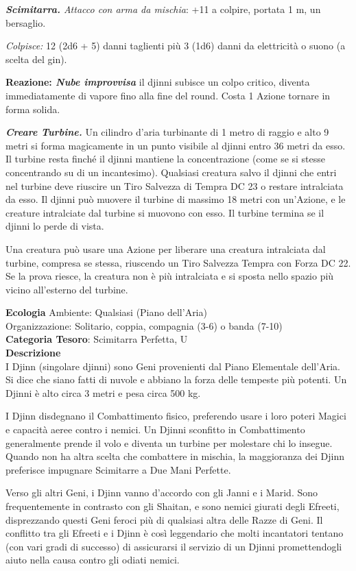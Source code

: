\begin{multicols}{2}
{\emph{\textbf{Scimitarra.} Attacco con arma da mischia}: +11 a colpire, portata 1 m, un bersaglio.

\emph{Colpisce:} 12 (2d6 + 5) danni taglienti più 3 (1d6) danni da elettricità o suono (a scelta del gin).

\textbf{Reazione: \emph{Nube improvvisa}} il djinni subisce un colpo critico, diventa immediatamente di vapore fino alla fine del round. Costa 1 Azione tornare in forma solida.

\emph{\textbf{Creare Turbine.}} Un cilindro d'aria turbinante di 1 metro di raggio e alto 9 metri si forma magicamente in un punto visibile al djinni entro 36 metri da esso. Il turbine resta finché il djinni mantiene la concentrazione (come se si stesse concentrando su di un incantesimo). Qualsiasi creatura salvo il djinni che entri nel turbine deve riuscire un Tiro Salvezza di Tempra DC 23 o restare intralciata da esso. Il djinni può muovere il turbine di massimo 18 metri con un'Azione, e le creature intralciate dal turbine si muovono con esso. Il turbine termina se il djinni lo perde di vista.

Una creatura può usare una Azione per liberare una creatura intralciata dal turbine, compresa se stessa, riuscendo un Tiro Salvezza Tempra con Forza DC 22. Se la prova riesce, la creatura non è più intralciata e si sposta nello spazio più vicino all'esterno del turbine.

\textbf{Ecologia}
Ambiente: Qualsiasi (Piano dell'Aria)\\
Organizzazione: Solitario, coppia, compagnia (3-6) o banda (7-10)\\
\textbf{Categoria Tesoro}: Scimitarra Perfetta, U\\
\textbf{Descrizione}\\
I Djinn (singolare djinni) sono Geni provenienti dal Piano Elementale dell'Aria. Si dice che siano fatti di nuvole e abbiano la forza delle tempeste più potenti. Un Djinni è alto circa 3 metri e pesa circa 500 kg.

I Djinn disdegnano il Combattimento fisico, preferendo usare i loro poteri Magici e capacità aeree contro i nemici. Un Djinni sconfitto in Combattimento generalmente prende il volo e diventa un turbine per molestare chi lo insegue. Quando non ha altra scelta che combattere in mischia, la maggioranza dei Djinn preferisce impugnare Scimitarre a Due Mani Perfette.

Verso gli altri Geni, i Djinn vanno d'accordo con gli Janni e i Marid. Sono frequentemente in contrasto con gli Shaitan, e sono nemici giurati degli Efreeti, disprezzando questi Geni feroci più di qualsiasi altra delle Razze di Geni. Il conflitto tra gli Efreeti e i Djinn è così leggendario che molti incantatori tentano (con vari gradi di successo) di assicurarsi il servizio di un Djinni promettendogli aiuto nella causa contro gli odiati nemici.

}
\end{multicols}
